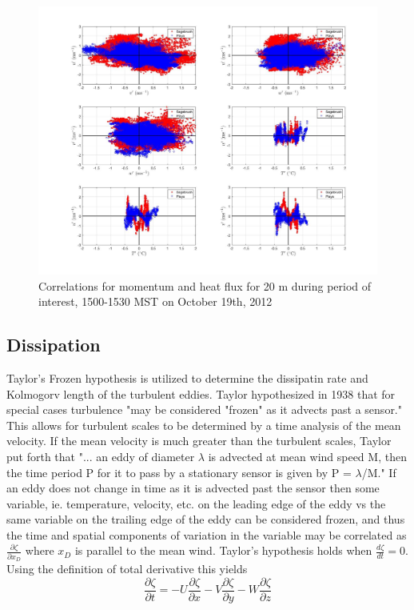 \documentclass[]{article}
\begin{document}
\begin{figure}
	\centering
	\includegraphics[width=\textwidth]{momentum_corr_20m}
		\caption{Correlations for momentum and heat flux for 20 m during period of interest, 1500-1530 MST on October 19th, 2012}
	\label{fig:mom_20}
\end{figure}


\subsection{Dissipation}
Taylor's Frozen hypothesis is utilized to determine the dissipatin rate and Kolmogorv length of the turbulent eddies. Taylor hypothesized in 1938 that for special cases turbulence "may be considered "frozen" as it advects past a sensor." \citep{Stull} This allows for turbulent scales to be determined by a time analysis of the mean velocity. If the mean velocity is much greater than the turbulent scales, Taylor put forth that "... an eddy of diameter $\lambda$ is advected at mean wind speed M, then the time period P for it to pass by a stationary sensor is given by P = $\lambda$/M." \citep{Stull} If an eddy does not change in time as it is advected past the sensor then some variable, ie. temperature, velocity, etc. on the leading edge of the eddy vs the same variable on the trailing edge of the eddy can be considered frozen, and thus the time and spatial components of variation in the variable may be correlated as $\frac{\partial \zeta}{\partial x_D}$ where $x_D$ is parallel to the mean wind. Taylor's hypothesis holds when $\frac{d\zeta}{dt} = 0$. Using the definition of total derivative this yields
\begin{equation} \label{eq:taylor}
\frac{\partial \zeta}{\partial t} = -U\frac{\partial \zeta}{\partial x} - V\frac{\partial \zeta}{\partial y} - W\frac{\partial \zeta}{\partial z}
\end{equation}
\end{document}
